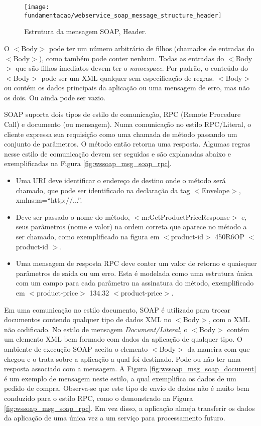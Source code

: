 \begin{figure}[!htb] \centering
  \centering
  \texttt{[image: fundamentacao/webservice\_soap\_message\_structure\_header]} 
  \caption{Estrutura da mensagem SOAP, Header.\cite{Papazoglou:2008}} 
  \label{fig:wssoap_msg_header}
\end{figure}

O $<$Body$>$ pode ter um número arbitrário de filhos (chamados de entradas do $<$Body$>$), como também pode conter nenhum. Todas as entradas do $<$Body$>$ que são filhos imediatos devem ter o \textit{namespace}. Por padrão, o conteúdo do $<$Body$>$ pode ser um XML qualquer sem especificação de regras. $<$Body$>$ ou contém os dados principais da aplicação ou uma mensagem de erro, mas não os dois. Ou ainda pode ser vazio.\cite{Papazoglou:2008}

SOAP suporta dois tipos de estilo de comunicação, RPC (Remote Procedure Call) e documento (ou mensagem). Numa comunicação no estilo RPC/Literal, o cliente expressa sua requisição como uma chamada de método passando um conjunto de parâmetros. O método então retorna uma resposta. Algumas regras nesse estilo de comunicação devem ser seguidas e são explanadas abaixo e exemplificadas na Figura \ref{fig:wssoap_msg_soap_rpc}.

\begin{itemize}
\item Uma URI deve identificar o endereço de destino onde o método será chamado, que pode ser identificado na declaração da tag $<$Envelope$>$, xmlns:m=``http:$//$...''.
\item Deve ser passado o nome do método, $<$m:GetProductPriceResponse$>$ e, seus parâmetros (nome e valor) na ordem correta que aparece no método a ser chamado, como exemplificado na figura em $<$product-id$>$ 450R6OP $<$product-id $>$.
\item Uma mensagem de resposta RPC deve conter um valor de retorno e quaisquer parâmetros de saída ou um erro. Esta é modelada como uma estrutura única com um campo para cada parâmetro na assinatura do método, exemplificado em $<$product-price$>$ 134.32 $<$product-price$>$.
\end{itemize}

Em uma comunicação no estilo documento, SOAP é utilizado para trocar documentos contendo qualquer tipo de dados XML no $<$Body$>$, com o XML não codificado. No estilo de mensagem \textit{Document/Literal}, o $<$Body$>$ contém um elemento XML bem formado com dados da aplicação de qualquer tipo. O ambiente de execução SOAP aceita o elemento $<$Body$>$ da maneira com que chegou e o trata sobre a aplicação a qual foi destinado. Pode ou não ter uma resposta associado com a mensagem. A Figura \ref{fig:wssoap_msg_soap_document} é um exemplo de mensagem neste estilo, a qual exemplifica os dados de um pedido de compra. Observa-se que este tipo de envio de dados não é muito bem conduzido para o estilo RPC, como o demonstrado na Figura \ref{fig:wssoap_msg_soap_rpc}. Em vez disso, a aplicação almeja transferir os dados da aplicação de uma única vez a um serviço para processamento futuro.\cite{Papazoglou:2008}

